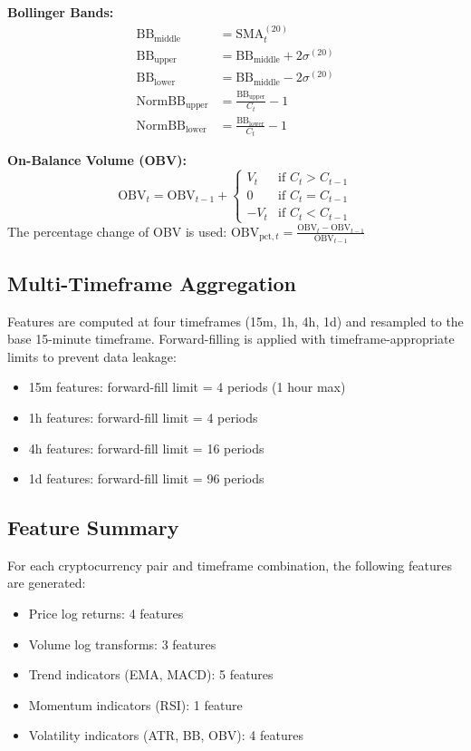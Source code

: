 \documentclass[12pt,a4paper]{article}
\begin{document}
\textbf{Bollinger Bands:}
\begin{align}
    \text{BB}_{\text{middle}} &= \text{SMA}_t^{(20)} \\
    \text{BB}_{\text{upper}} &= \text{BB}_{\text{middle}} + 2\sigma^{(20)} \\
    \text{BB}_{\text{lower}} &= \text{BB}_{\text{middle}} - 2\sigma^{(20)} \\
    \text{NormBB}_{\text{upper}} &= \frac{\text{BB}_{\text{upper}}}{C_t} - 1 \\
    \text{NormBB}_{\text{lower}} &= \frac{\text{BB}_{\text{lower}}}{C_t} - 1
\end{align}

\textbf{On-Balance Volume (OBV):}
\begin{equation}
    \text{OBV}_t = \text{OBV}_{t-1} + \begin{cases}
        V_t & \text{if } C_t > C_{t-1} \\
        0 & \text{if } C_t = C_{t-1} \\
        -V_t & \text{if } C_t < C_{t-1}
    \end{cases}
\end{equation}
The percentage change of OBV is used: $\text{OBV}_{\text{pct},t} = \frac{\text{OBV}_t - \text{OBV}_{t-1}}{\text{OBV}_{t-1}}$

\subsection{Multi-Timeframe Aggregation}
Features are computed at four timeframes (15m, 1h, 4h, 1d) and resampled to the base 15-minute timeframe. Forward-filling is applied with timeframe-appropriate limits to prevent data leakage:
\begin{itemize}
    \item 15m features: forward-fill limit = 4 periods (1 hour max)
    \item 1h features: forward-fill limit = 4 periods
    \item 4h features: forward-fill limit = 16 periods
    \item 1d features: forward-fill limit = 96 periods
\end{itemize}

\subsection{Feature Summary}
For each cryptocurrency pair and timeframe combination, the following features are generated:
\begin{itemize}
    \item Price log returns: 4 features
    \item Volume log transforms: 3 features
    \item Trend indicators (EMA, MACD): 5 features
    \item Momentum indicators (RSI): 1 feature
    \item Volatility indicators (ATR, BB, OBV): 4 features
\end{itemize}
\end{document}

